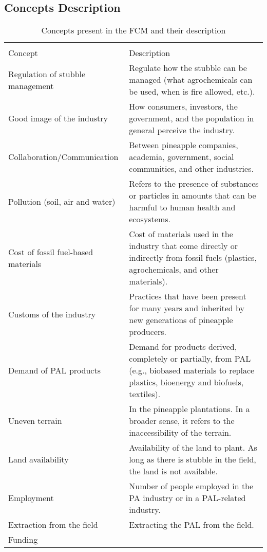 \subsection{Concepts Description}


\begin{table}[htp]
\scriptsize
\centering
\caption{Concepts present in the FCM and their description}
\label{conceptsList}
\begin{tabular}{p{}p{}} \hline \hline \\ Concept &
  Description \\ \hline
Regulation of stubble management &
  Regulate how the stubble can be managed (what agrochemicals can be used,  when is fire allowed, etc.). \\ \hline
Good image of the industry &
  How consumers, investors, the government, and the population in general perceive the industry. \\ \hline
Collaboration/Communication &
  Between pineapple companies, academia, government, social communities, and other industries. \\ \hline
Pollution (soil, air and water) &
  Refers to the presence of substances or particles in amounts that can be harmful to human health and ecosystems. \\ \hline
Cost of fossil fuel-based materials &
  Cost of materials used in the industry that come directly or indirectly from fossil fuels (plastics, agrochemicals, and other materials). \\ \hline
Customs of the industry &
  Practices that have been present for many years and inherited by new generations of pineapple producers. \\ \hline
Demand of PAL products &
  Demand for products derived, completely or partially, from PAL (e.g.,  biobased materials to replace plastics, bioenergy and biofuels, textiles). \\ \hline
Uneven terrain &
  In the pineapple plantations. In a broader sense, it refers to the inaccessibility of the terrain. \\ \hline
Land availability &
  Availability of the land to plant. As long as there is stubble in the field, the land is not available. \\ \hline
Employment &
  Number of people employed in the PA industry or in a PAL-related industry. \\ \hline
Extraction from the field &
  Extracting the PAL from the field. \\ \hline
Funding &

\end{tabular}
\end{table}

